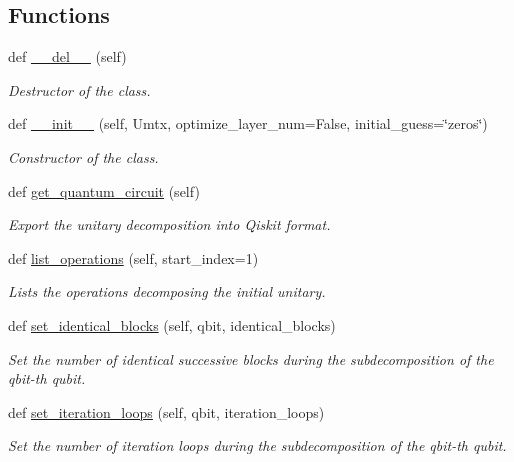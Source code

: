 \subsection*{Functions}
\begin{DoxyCompactItemize}
\item 
def \hyperlink{group__python_gaeba96037339a2173be32f9da54b2b640}{\+\_\+\+\_\+del\+\_\+\+\_\+} (self)
\begin{DoxyCompactList}\small\item\em Destructor of the class. \end{DoxyCompactList}\item 
def \hyperlink{group__python_gaa61a063ce130eec9f91483ea366c4875}{\+\_\+\+\_\+init\+\_\+\+\_\+} (self, Umtx, optimize\+\_\+layer\+\_\+num=False, initial\+\_\+guess=\char`\"{}zeros\char`\"{})
\begin{DoxyCompactList}\small\item\em Constructor of the class. \end{DoxyCompactList}\item 
def \hyperlink{group__python_ga7f84dd22a6748be01c990c734e95c23d}{get\+\_\+quantum\+\_\+circuit} (self)
\begin{DoxyCompactList}\small\item\em Export the unitary decomposition into Qiskit format. \end{DoxyCompactList}\item 
def \hyperlink{group__python_ga90a4aa2757be84217c83aad59a5baf60}{list\+\_\+operations} (self, start\+\_\+index=1)
\begin{DoxyCompactList}\small\item\em Lists the operations decomposing the initial unitary. \end{DoxyCompactList}\item 
def \hyperlink{group__python_ga0b1a2119452bd55192ed3e49450030aa}{set\+\_\+identical\+\_\+blocks} (self, qbit, identical\+\_\+blocks)
\begin{DoxyCompactList}\small\item\em Set the number of identical successive blocks during the subdecomposition of the qbit-\/th qubit. \end{DoxyCompactList}\item 
def \hyperlink{group__python_ga5c703393d528f31a2d1aa2cc7282c691}{set\+\_\+iteration\+\_\+loops} (self, qbit, iteration\+\_\+loops)
\begin{DoxyCompactList}\small\item\em Set the number of iteration loops during the subdecomposition of the qbit-\/th qubit. \end{DoxyCompactList}\item 

\end{DoxyCompactItemize}
